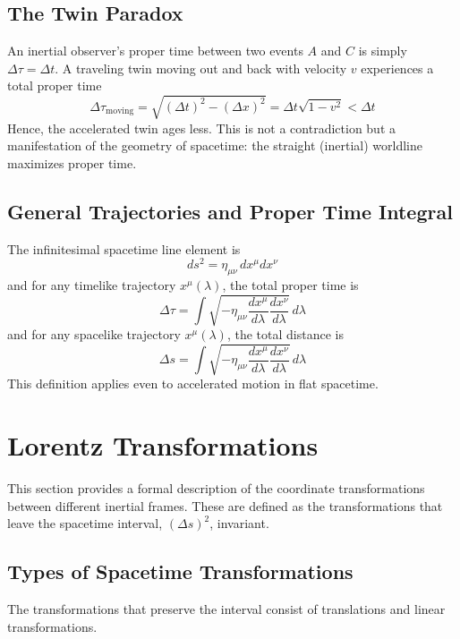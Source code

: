 \documentclass[11pt, a4paper]{report}
\begin{document}
\subsection*{The Twin Paradox}

An inertial observer’s proper time between two events $A$ and $C$ is simply $\Delta \tau = \Delta t$.  
A traveling twin moving out and back with velocity $v$ experiences a total proper time
\[
\Delta \tau_{\text{moving}} =
\sqrt{(\Delta t)^2-(\Delta x)^2}
=\Delta t \sqrt{1 - v^2} < \Delta t
\]
Hence, the accelerated twin ages less.  
This is not a contradiction but a manifestation of the geometry of spacetime: the straight (inertial) worldline maximizes proper time.

\subsection*{General Trajectories and Proper Time Integral}

The infinitesimal spacetime line element is
\[
ds^2 = \eta_{\mu\nu} \, dx^\mu dx^\nu
\]
and for any timelike trajectory $x^\mu(\lambda)$, the total proper time is
\[
\Delta \tau = \int \sqrt{ -\eta_{\mu\nu} 
\frac{dx^\mu}{d\lambda} \frac{dx^\nu}{d\lambda} } \, d\lambda
\]
and for any spacelike trajectory $x^\mu(\lambda)$, the total distance is
\[
\Delta s = \int \sqrt{ -\eta_{\mu\nu} 
\frac{dx^\mu}{d\lambda} \frac{dx^\nu}{d\lambda} } \, d\lambda
\]
This definition applies even to accelerated motion in flat spacetime.


\section{Lorentz Transformations}

This section provides a formal description of the coordinate transformations between different inertial frames. These are defined as the transformations that leave the spacetime interval, $(\Delta s)^2$, invariant.

\subsection*{Types of Spacetime Transformations}

The transformations that preserve the interval consist of translations and linear transformations.
\end{document}
